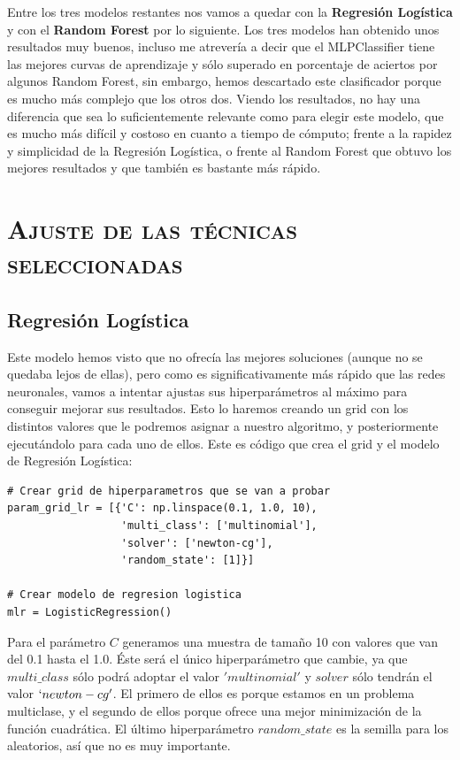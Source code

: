 \documentclass[11pt,a4paper]{article}
\begin{document}
Entre los tres modelos restantes nos vamos a quedar con la \textbf{Regresión Logística} y con el \textbf{Random Forest} por lo siguiente.
Los tres modelos han obtenido unos resultados muy buenos, incluso me atrevería a decir que el MLPClassifier tiene las mejores curvas de
aprendizaje y sólo superado en porcentaje de aciertos por algunos Random Forest, sin embargo, hemos descartado este clasificador porque es
mucho más complejo que los otros dos. Viendo los resultados, no hay una diferencia que sea lo suficientemente relevante como para elegir
este modelo, que es mucho más difícil y costoso en cuanto a tiempo de cómputo; frente a la rapidez y simplicidad de la Regresión Logística,
o frente al Random Forest que obtuvo los mejores resultados y que también es bastante más rápido.

\section{\textsc{Ajuste de las técnicas seleccionadas}}

\subsection{Regresión Logística}

Este modelo hemos visto que no ofrecía las mejores soluciones (aunque no se quedaba lejos de ellas), pero como es significativamente más
rápido que las redes neuronales, vamos a intentar ajustas sus hiperparámetros al máximo para conseguir mejorar sus resultados. Esto lo
haremos creando un grid con los distintos valores que le podremos asignar a nuestro algoritmo, y posteriormente ejecutándolo para cada uno
de ellos. Este es código que crea el grid y el modelo de Regresión Logística:

\begin{lstlisting}
# Crear grid de hiperparametros que se van a probar
param_grid_lr = [{'C': np.linspace(0.1, 1.0, 10),
                  'multi_class': ['multinomial'],
                  'solver': ['newton-cg'],
                  'random_state': [1]}]

# Crear modelo de regresion logistica
mlr = LogisticRegression()
\end{lstlisting}

Para el parámetro $C$ generamos una muestra de tamaño 10 con valores que van del 0.1 hasta el 1.0. Éste será el único hiperparámetro que
cambie, ya que $multi\_class$ sólo podrá adoptar el valor $'multinomial'$ y $solver$ sólo tendrán el valor $`newton-cg'$. El primero de
ellos es porque estamos en un problema multiclase, y el segundo de ellos porque ofrece una mejor minimización de la función cuadrática. El
último hiperparámetro $random\_state$ es la semilla para los aleatorios, así que no es muy importante.
\end{document}

